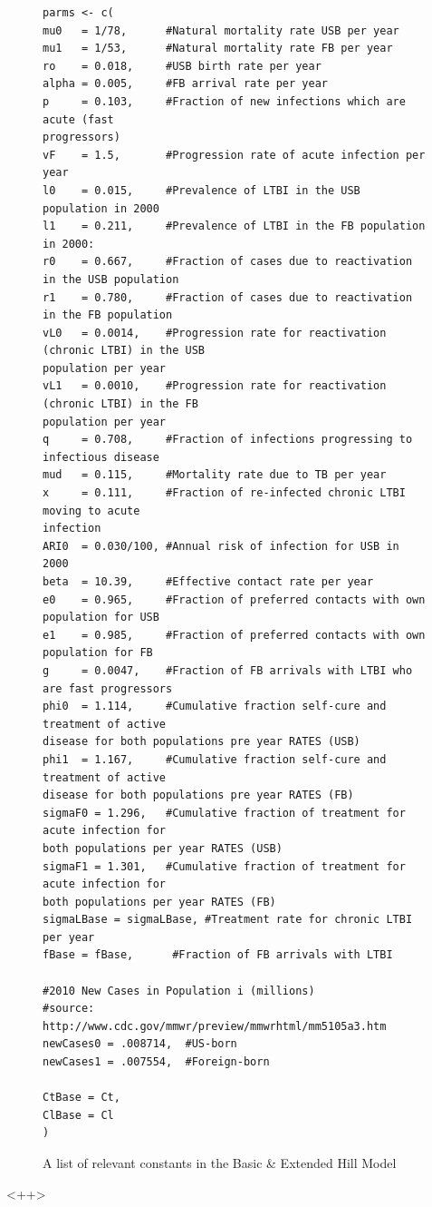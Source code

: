 \documentclass{amsart}
\begin{document}
\begin{figure}[h]
\begin{center}
{\begin{verbatim}
parms <- c(
mu0   = 1/78,      #Natural mortality rate USB per year
mu1   = 1/53,      #Natural mortality rate FB per year
ro    = 0.018,     #USB birth rate per year
alpha = 0.005,     #FB arrival rate per year
p     = 0.103,     #Fraction of new infections which are acute (fast
progressors)
vF    = 1.5,       #Progression rate of acute infection per year
l0    = 0.015,     #Prevalence of LTBI in the USB population in 2000
l1    = 0.211,     #Prevalence of LTBI in the FB population in 2000: 
r0    = 0.667,     #Fraction of cases due to reactivation in the USB population
r1    = 0.780,     #Fraction of cases due to reactivation in the FB population
vL0   = 0.0014,    #Progression rate for reactivation (chronic LTBI) in the USB
population per year
vL1   = 0.0010,    #Progression rate for reactivation (chronic LTBI) in the FB
population per year
q     = 0.708,     #Fraction of infections progressing to infectious disease
mud   = 0.115,     #Mortality rate due to TB per year
x     = 0.111,     #Fraction of re-infected chronic LTBI moving to acute
infection
ARI0  = 0.030/100, #Annual risk of infection for USB in 2000
beta  = 10.39,     #Effective contact rate per year
e0    = 0.965,     #Fraction of preferred contacts with own population for USB
e1    = 0.985,     #Fraction of preferred contacts with own population for FB
g     = 0.0047,    #Fraction of FB arrivals with LTBI who are fast progressors
phi0  = 1.114,     #Cumulative fraction self-cure and treatment of active
disease for both populations pre year RATES (USB)
phi1  = 1.167,     #Cumulative fraction self-cure and treatment of active
disease for both populations pre year RATES (FB)
sigmaF0 = 1.296,   #Cumulative fraction of treatment for acute infection for
both populations per year RATES (USB)
sigmaF1 = 1.301,   #Cumulative fraction of treatment for acute infection for
both populations per year RATES (FB)
sigmaLBase = sigmaLBase, #Treatment rate for chronic LTBI per year
fBase = fBase,      #Fraction of FB arrivals with LTBI

#2010 New Cases in Population i (millions)
#source: http://www.cdc.gov/mmwr/preview/mmwrhtml/mm5105a3.htm
newCases0 = .008714,  #US-born
newCases1 = .007554,  #Foreign-born

CtBase = Ct,
ClBase = Cl
)
    \end{verbatim}
  }
  \end{center}
  \caption{A list of relevant constants in the Basic \& Extended Hill Model}
  \label{fig:basicHillConstants}
\end{figure}<++>
\end{document}
